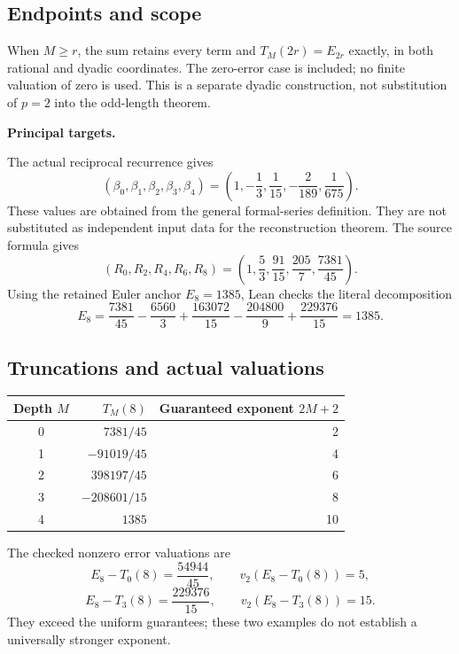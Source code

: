 \subsection*{Endpoints and scope}
When $M\geq r$, the sum retains every term and $T_M(2r)=E_{2r}$ exactly, in both rational and dyadic coordinates. The zero-error case is included; no finite valuation of zero is used. This is a separate dyadic construction, not substitution of $p=2$ into the odd-length theorem.

\textbf{Principal targets.}\par
{}\par
{}\par
{}
\par\medskip
{}
The actual reciprocal recurrence gives
\[
 (\beta_0,\beta_1,\beta_2,\beta_3,\beta_4)
 =\left(1,-\frac13,\frac1{15},-\frac2{189},\frac1{675}\right).
\]
These values are obtained from the general formal-series definition. They are not substituted as independent input data for the reconstruction theorem. The source formula gives
\[
 (R_0,R_2,R_4,R_6,R_8)
 =\left(1,\frac53,\frac{91}{15},\frac{205}{7},\frac{7381}{45}\right).
\]
Using the retained Euler anchor $E_8=1385$, Lean checks the literal decomposition
\[
 E_8=\frac{7381}{45}-\frac{6560}{3}+\frac{163072}{15}
       -\frac{204800}{9}+\frac{229376}{15}=1385.
\]

\subsection*{Truncations and actual valuations}
\begin{center}
\begin{tabular}{@{}crr@{}}
\toprule
Depth $M$ & $T_M(8)$ & Guaranteed exponent $2M+2$\\\midrule
0 & $7381/45$ & 2\\[3pt]
1 & $-91019/45$ & 4\\[3pt]
2 & $398197/45$ & 6\\[3pt]
3 & $-208601/15$ & 8\\[3pt]
4 & $1385$ & 10\\\bottomrule
\end{tabular}
\end{center}
The checked nonzero error valuations are
\[
 E_8-T_0(8)=\frac{54944}{45},\qquad v_2(E_8-T_0(8))=5,
\]
\[
 E_8-T_3(8)=\frac{229376}{15},\qquad v_2(E_8-T_3(8))=15.
\]
They exceed the uniform guarantees; these two examples do not establish a universally stronger exponent.

